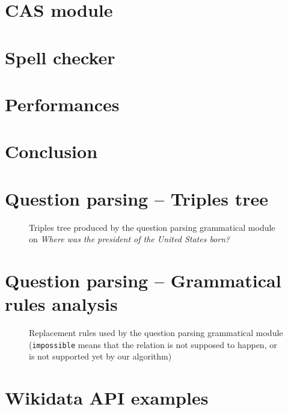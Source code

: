 \documentclass[a4paper,10pt]{report}
\begin{document}
\chapter{CAS module}
    \label{cas}
    

\chapter{Spell checker}
    \label{spellchecker}
    

\chapter{Performances}
    \label{performances}
    

\chapter*{Conclusion}
    \label{conclusion}
    



\nocite{*}

\appendix

\chapter{Question parsing \--- Triples tree}

\begin{figure}[!ht]

\caption{Triples tree produced by the question parsing grammatical module on \textit{Where was the president of the United States born?}}
\label{triple_tree}
\end{figure}

\chapter{Question parsing \--- Grammatical rules analysis}

\begin{figure}[!ht]

\caption{Replacement rules used by the question parsing grammatical module (\texttt{impossible} means that the relation is not supposed to happen, or is not supported yet by our algorithm)}
\label{gramm_rule}
\end{figure}

\chapter{Wikidata API examples}

\end{document}
